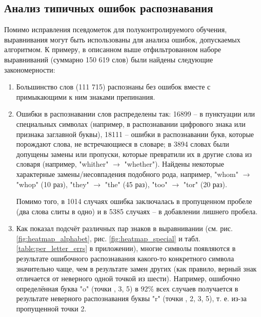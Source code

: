 \documentclass{main.tex}[subfiles]
\begin{document}
\subsection{Анализ типичных ошибок распознавания}

Помимо исправления псевдометок для полуконтролируемого обучения, выравнивания могут быть использованы для анализа ошибок, допускаемых алгоритмом.
К примеру, в описанном выше отфильтрованном наборе выравниваний (суммарно 150 619 слов) были найдены следующие закономерности:
\begin{enumerate}[noitemsep]
    \item Большинство слов (111 715) распознаны без ошибок вместе с примыкающими к ним знаками препинания.
    \item Ошибки в распознавании слов распределены так: 16899 -- в пунктуации или специальных символах (например, в распознавании цифрового знака или признака заглавной буквы), 18111 -- ошибки в распознавании букв, которые порождают слова, не встречающиеся в словаре; в 3894 словах были допущены замены или пропуски, которые превратили их в другие слова из словаря (например, "whither"\hspace{0pt} $\rightarrow$ "whether"\hspace{0pt}).
    Найдены некоторые характерные замены/несовпадения подобного рода, например, "whom"\hspace{0pt} $\rightarrow$ "whop"\hspace{0pt} (10 раз), "they"\hspace{0pt} $\rightarrow$ "the"\hspace{0pt} (45 раз), "too"\hspace{0pt} $\rightarrow$ "tor"\hspace{0pt} (20 раз).

    Помимо того, в 1014 случаях ошибка заключалась в пропущенном пробеле (два слова слиты в одно) и в 5385 случаях -- в добавлении лишнего пробела.
    \item Как показал подсчёт различных пар знаков в выравнивании (см. рис. \ref{fig:heatmap_alphabet}, рис. \ref{fig:heatmap_special} и табл. \ref{table:per_letter_errs} в приложении), многие символы появляются в результате ошибочного распознавания какого-то конкретного символа значительно чаще, чем в результате замен других (как правило, верный знак отличается от неверного одной точкой из шести).
    Например, ошибочно определённая буква "o"\hspace{0pt} (точки , 3, 5) в $92\%$ всех случаев получается в результате неверного распознавания буквы "r"\hspace{0pt} (точки , 2, 3, 5), т. е. из-за пропущенной точки 2.
\end{enumerate}
\end{document}
